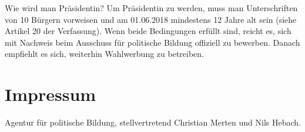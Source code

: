 \documentclass{sasbase}
\begin{document}
\begin{question}{Wie wird man Pr\"{a}sidentin?}
	Um Pr\"{a}sidentin zu werden, muss man Unterschriften von 10 B\"{u}rgern vorweisen und am 01.06.2018 mindestens 12 Jahre alt sein (siehe Artikel 20 der Verfassung). Wenn beide Bedingungen erf\"{u}llt sind, reicht es, sich mit Nachweis beim Ausschuss f\"{u}r politische Bildung offiziell zu bewerben. Danach empfiehlt es sich, weiterhin Wahlwerbung zu betreiben.
\end{question}

\section{Impressum}
Agentur f\"{u}r politische Bildung, stellvertretend Christian Merten und Nils Hebach.
\end{document}
